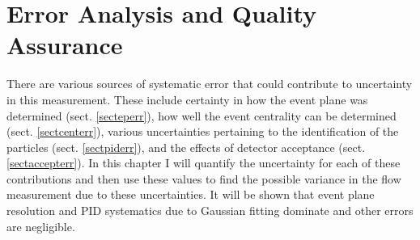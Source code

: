 
\chapter{Error Analysis and Quality Assurance} %
There are various sources of systematic error that could contribute to uncertainty in this measurement. These include certainty in how the event plane was determined (sect. \ref{secteperr}), how well the event centrality can be determined (sect. \ref{sectcenterr}), various uncertainties pertaining to the identification of the particles (sect. \ref{sectpiderr}), and the effects of detector acceptance (sect. \ref{sectaccepterr}). In this chapter I will quantify the uncertainty for each of these contributions and then use these values to find the possible variance in the flow measurement due to these uncertainties. It will be shown that event plane resolution and PID systematics due to Gaussian fitting dominate and other errors are negligible.

